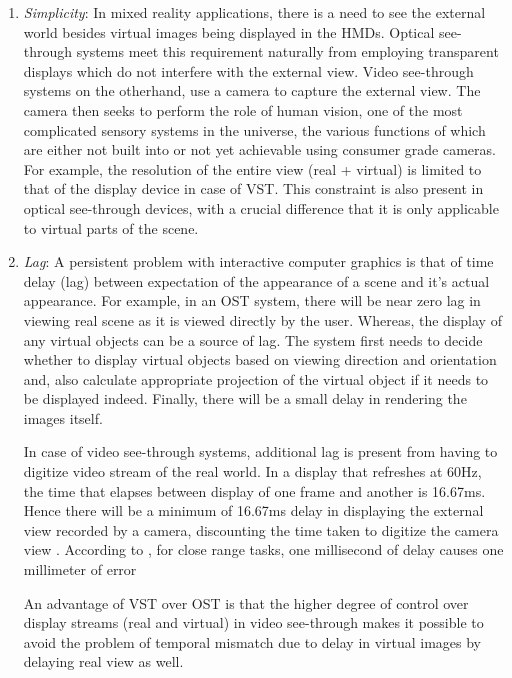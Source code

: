 \begin{enumerate}
\item \textit{Simplicity}: In mixed reality applications, there is a need to see the external world besides virtual images being displayed in the HMDs. Optical see-through systems meet this requirement naturally from employing transparent displays which do not interfere with the external view. Video see-through systems on the otherhand, use a camera to capture the external view. The camera then seeks to perform the role of human vision, one of the most complicated sensory systems in the universe, the various functions of which are either not built into or not yet achievable using consumer grade cameras. For example, the resolution of the entire view (real + virtual) is limited to that of the display device in case of VST. This constraint is also present in optical see-through devices, with a crucial difference that it is only applicable to virtual parts of the scene. 

\item \textit{Lag}: A persistent problem with interactive computer graphics is that of time delay (lag) between expectation of the appearance of a scene and it's actual appearance. For example, in an OST system, there will be near zero lag in viewing real scene as it is viewed directly by the user. Whereas, the display of any virtual objects can be a source of lag. The system first needs to decide whether to display virtual objects based on viewing direction and orientation and, also calculate appropriate projection of the virtual object if it needs to be displayed indeed. Finally, there will be a small delay in rendering the images itself. 

In case of video see-through systems, additional lag is present from having to digitize video stream of the real world. In a display that refreshes at 60Hz, the time that elapses between display of one frame and another is 16.67ms. Hence there will be a minimum of 16.67ms delay in displaying the external view recorded by a camera, discounting the time taken to digitize the camera view . According to \parencite{ellis1997factors}, for close range tasks, one millisecond of delay causes one millimeter of error

An advantage of VST over OST is that the higher degree of control over display streams (real and virtual) in video see-through makes it possible to avoid the problem of temporal mismatch due to delay in virtual images by delaying real view as well. 
 
\end{enumerate}

